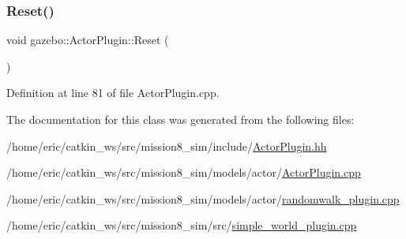 \mbox{\label{classgazebo_1_1ActorPlugin_a94e1e04cacc4d05855f16ced457e938d}} 
\subsubsection{\texorpdfstring{Reset()}{Reset()}\hspace{0.1cm}{\footnotesize\ttfamily [2/2]}}
{\footnotesize\ttfamily void gazebo\+::\+Actor\+Plugin\+::\+Reset (\begin{DoxyParamCaption}{ }\end{DoxyParamCaption})\hspace{0.3cm}{\ttfamily [virtual]}}



Definition at line 81 of file Actor\+Plugin.\+cpp.



The documentation for this class was generated from the following files\+:\begin{DoxyCompactItemize}
\item 
/home/eric/catkin\+\_\+ws/src/mission8\+\_\+sim/include/\mbox{\hyperlink{include_2ActorPlugin_8hh}{Actor\+Plugin.\+hh}}\item 
/home/eric/catkin\+\_\+ws/src/mission8\+\_\+sim/models/actor/\mbox{\hyperlink{ActorPlugin_8cpp}{Actor\+Plugin.\+cpp}}\item 
/home/eric/catkin\+\_\+ws/src/mission8\+\_\+sim/models/actor/\mbox{\hyperlink{randomwalk__plugin_8cpp}{randomwalk\+\_\+plugin.\+cpp}}\item 
/home/eric/catkin\+\_\+ws/src/mission8\+\_\+sim/src/\mbox{\hyperlink{simple__world__plugin_8cpp}{simple\+\_\+world\+\_\+plugin.\+cpp}}\end{DoxyCompactItemize}
